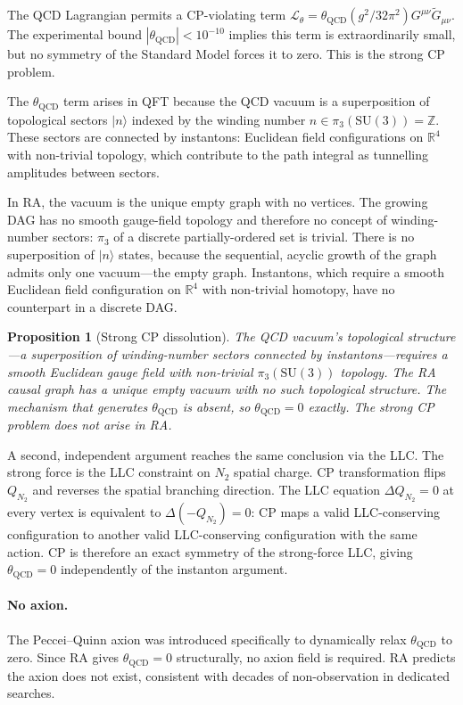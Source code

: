 \documentclass[11pt]{article}
\newtheorem{proposition}{Proposition}
\begin{document}
The QCD Lagrangian permits a CP-violating term $\mathcal{L}_\theta=\theta_{\mathrm{QCD}}(g^2/32\pi^2)G^{\mu\nu}\tilde G_{\mu\nu}$. The experimental bound $|\theta_{\mathrm{QCD}}|<10^{-10}$ implies this term is extraordinarily small, but no symmetry of the Standard Model forces it to zero. This is the strong CP problem.

The $\theta_{\mathrm{QCD}}$ term arises in QFT because the QCD vacuum is a superposition of topological sectors $|n\rangle$ indexed by the winding number $n\in\pi_3(\mathrm{SU}(3))=\mathbb{Z}$. These sectors are connected by instantons: Euclidean field configurations on $\mathbb{R}^4$ with non-trivial topology, which contribute to the path integral as tunnelling amplitudes between sectors.

In RA, the vacuum is the unique empty graph with no vertices. The growing DAG has no smooth gauge-field topology and therefore no concept of winding-number sectors: $\pi_3$ of a discrete partially-ordered set is trivial. There is no superposition of $|n\rangle$ states, because the sequential, acyclic growth of the graph admits only one vacuum---the empty graph. Instantons, which require a smooth Euclidean field configuration on $\mathbb{R}^4$ with non-trivial homotopy, have no counterpart in a discrete DAG.

\begin{proposition}[Strong CP dissolution]
The QCD vacuum's topological structure---a superposition of winding-number sectors connected by instantons---requires a smooth Euclidean gauge field with non-trivial $\pi_3(\mathrm{SU}(3))$ topology. The RA causal graph has a unique empty vacuum with no such topological structure. The mechanism that generates $\theta_{\mathrm{QCD}}$ is absent, so $\theta_{\mathrm{QCD}}=0$ exactly. The strong CP problem does not arise in RA.
\end{proposition}

A second, independent argument reaches the same conclusion via the LLC. The strong force is the LLC constraint on $N_2$ spatial charge. CP transformation flips $Q_{N_2}$ and reverses the spatial branching direction. The LLC equation $\Delta Q_{N_2}=0$ at every vertex is equivalent to $\Delta(-Q_{N_2})=0$: CP maps a valid LLC-conserving configuration to another valid LLC-conserving configuration with the same action. CP is therefore an exact symmetry of the strong-force LLC, giving $\theta_{\mathrm{QCD}}=0$ independently of the instanton argument.

\paragraph{No axion.} The Peccei--Quinn axion was introduced specifically to dynamically relax $\theta_{\mathrm{QCD}}$ to zero. Since RA gives $\theta_{\mathrm{QCD}}=0$ structurally, no axion field is required. RA predicts the axion does not exist, consistent with decades of non-observation in dedicated searches.
\end{document}
